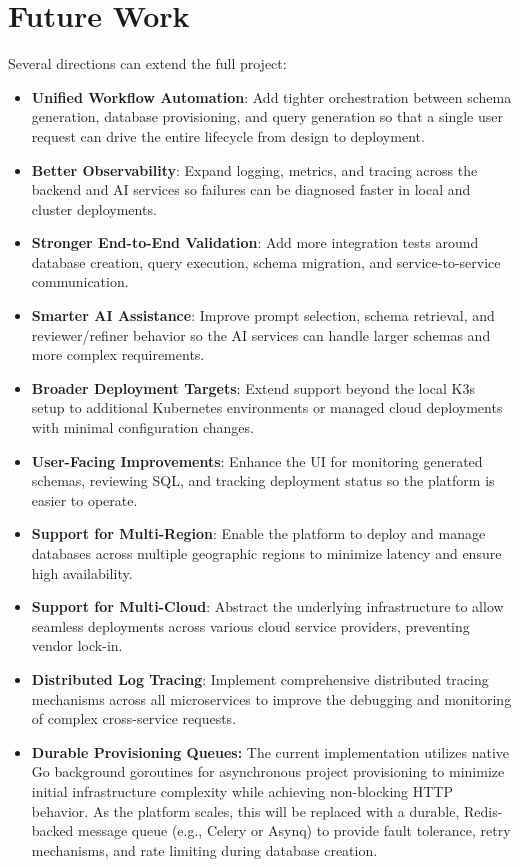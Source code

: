 \section{Future Work}
\label{sec:7.3_future_work}

Several directions can extend the full project:

\begin{itemize}
   \item \textbf{Unified Workflow Automation}: Add tighter orchestration between schema generation, database provisioning, and query generation so that a single user request can drive the entire lifecycle from design to deployment.
   \item \textbf{Better Observability}: Expand logging, metrics, and tracing across the backend and AI services so failures can be diagnosed faster in local and cluster deployments.
   \item \textbf{Stronger End-to-End Validation}: Add more integration tests around database creation, query execution, schema migration, and service-to-service communication.
   \item \textbf{Smarter AI Assistance}: Improve prompt selection, schema retrieval, and reviewer/refiner behavior so the AI services can handle larger schemas and more complex requirements.
   \item \textbf{Broader Deployment Targets}: Extend support beyond the local K3s setup to additional Kubernetes environments or managed cloud deployments with minimal configuration changes.
   \item \textbf{User-Facing Improvements}: Enhance the UI for monitoring generated schemas, reviewing SQL, and tracking deployment status so the platform is easier to operate.
   \item \textbf{Support for Multi-Region}: Enable the platform to deploy and manage databases across multiple geographic regions to minimize latency and ensure high availability.
   \item \textbf{Support for Multi-Cloud}: Abstract the underlying infrastructure to allow seamless deployments across various cloud service providers, preventing vendor lock-in.
   \item \textbf{Distributed Log Tracing}: Implement comprehensive distributed tracing mechanisms across all microservices to improve the debugging and monitoring of complex cross-service requests.
   \item \textbf{Durable Provisioning Queues:} The current implementation utilizes native Go background goroutines for asynchronous project provisioning to minimize initial infrastructure complexity while achieving non-blocking HTTP behavior. As the platform scales, this will be replaced with a durable, Redis-backed message queue (e.g., Celery or Asynq) to provide fault tolerance, retry mechanisms, and rate limiting during database creation.

\end{itemize}
